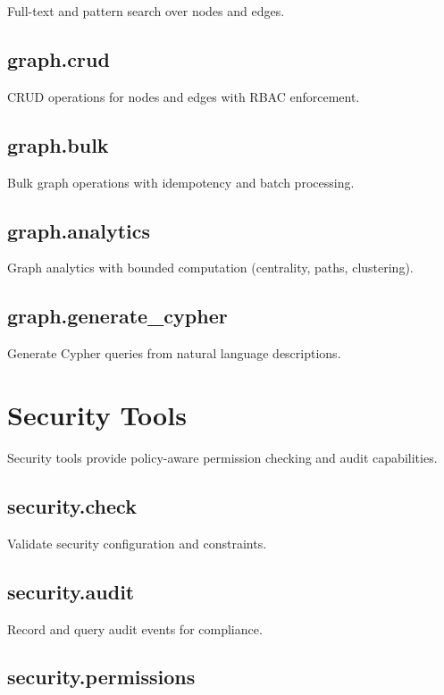 \documentclass[a4paper,twoside]{sapthesis}
\begin{document}
Full-text and pattern search over nodes and edges.

\subsection{graph.crud}

CRUD operations for nodes and edges with RBAC enforcement.

\subsection{graph.bulk}

Bulk graph operations with idempotency and batch processing.

\subsection{graph.analytics}

Graph analytics with bounded computation (centrality, paths, clustering).

\subsection{graph.generate\_cypher}

Generate Cypher queries from natural language descriptions.

\section{Security Tools}
\label{app:tools:security}

Security tools provide policy-aware permission checking and audit capabilities.

\subsection{security.check}

Validate security configuration and constraints.

\subsection{security.audit}

Record and query audit events for compliance.

\subsection{security.permissions}
\end{document}
